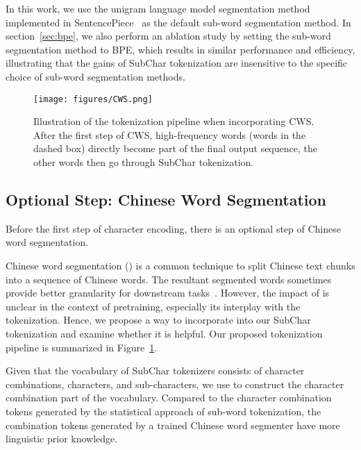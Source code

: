 In this work, we use the unigram language model segmentation method~\cite{Kudo2018} implemented in SentencePiece~\cite{sentencepiece} as the default sub-word segmentation method. In section~\ref{sec:bpe}, we also perform an ablation study by setting the sub-word segmentation method to BPE, which results in similar performance and efficiency, illustrating that the gains of SubChar tokenization are insensitive to the specific choice of sub-word segmentation methods. 




\begin{figure}[t]
\centering
\texttt{[image: figures/CWS.png]}
\caption{Illustration of the tokenization pipeline when incorporating CWS. After the first step of CWS, high-frequency words (words in the dashed box) directly become part of the final output sequence, the other words then go through SubChar tokenization.}
\label{fig:cws}
\end{figure}


\subsection{Optional Step: Chinese Word Segmentation}
\label{sec:cws}

Before the first step of character encoding, there is an optional step of Chinese word segmentation. 

Chinese word segmentation (\cws{}) is a common technique to split Chinese text chunks into a sequence of Chinese words. The resultant segmented words sometimes provide better granularity for downstream tasks~\cite{CWS-NMT}. However, the impact of \cws{} is unclear in the context of pretraining, especially its interplay with the tokenization. Hence, we propose a way to incorporate \cws{} into our SubChar tokenization and examine whether it is helpful. Our proposed tokenization pipeline is summarized in Figure~\ref{fig:cws}.

Given that the vocabulary of SubChar tokenizers consists of character combinations, characters, and sub-characters, we use \cws{} to construct the character combination part of the vocabulary. Compared to the character combination tokens generated by the statistical approach of sub-word tokenization, the combination tokens generated by a trained Chinese word segmenter have more linguistic prior knowledge. 

